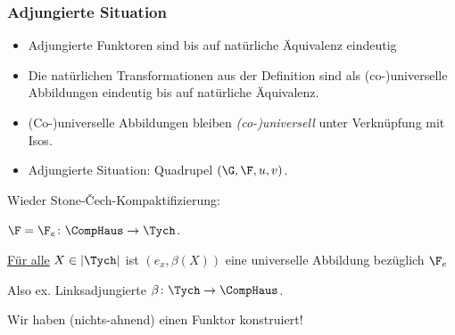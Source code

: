 \begin{frame}
  \frametitle{Adjungierte Situation}

  \begin{itemize}
    \item<+-> Adjungierte Funktoren sind bis auf natürliche Äquivalenz eindeutig
    \item<+-> Die natürlichen Transformationen aus der Definition sind als (co-)universelle Abbildungen eindeutig bis auf natürliche Äquivalenz.
    \item<+-> (Co-)universelle Abbildungen bleiben \emph{(co-)universell} unter Verknüpfung mit Isos.
    \item<+-> Adjungierte Situation: Quadrupel $(\G, \F, u, v)$. 
  \end{itemize}

\pause

  \begin{ex*}
     Wieder Stone-\v{C}ech-Kompaktifizierung:

     $\F = \F_e \colon \CompHaus \to \Tych$.

\pause

     \underline{Für alle} $X \in |\Tych|$ ist $(e_x, \beta(X))$ eine universelle Abbildung bezüglich $\F_e$
     
     Also ex. Linksadjungierte $\beta \colon \Tych \to \CompHaus$.
     \vspace{1em}

\pause

     Wir haben (nichts-ahnend) einen Funktor konstruiert!
  \end{ex*}

\end{frame}

